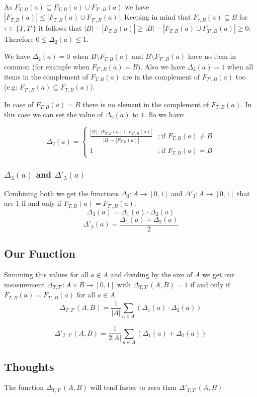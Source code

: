 As $F_{T, B}(a) \subseteq F_{T, B}(a) \cup F_{T', B}(a)$ we have $|F_{T, B}(a)| \leq |F_{T, B}(a) \cup F_{T', B}(a)|$.
Keeping in mind that $F_{\tau, B}(a) \subseteq B$ for $\tau \in \{ T, T' \}$
it follows that $|B| - |F_{T, B}(a)| \geq |B| - |F_{T, B}(a) \cup F_{T', B}(a)| \geq 0$.
Therefore $0 \leq \Delta_2(a) \leq 1$.

We have $\Delta_2(a) = 0$ when $B \setminus F_{T, B}(a)$ and $B \setminus F_{T', B}(a)$ have no item in common (for example when $F_{T', B}(a) = B$).
Also we have $\Delta_2(a) = 1$ when all items in the complement of $F_{T, B}(a)$ are in the complement of $F_{T', B}(a)$ too (e.g: $F_{T', B}(a) \subseteq F_{T, B}(a)$).

In case of $F_{T, B}(a) = B$ there is no element in the complement of $F_{T, B}(a)$.
In this case we can set the value of $\Delta_2(a)$ to $1$.
So we have:

\[
  \Delta_2(a) =
\left\{\begin{array}{ll}
    \frac{\left|B| - |F_{T, B}(a) \cup F_{T', B}(a)\right|}{|B| - |F_{T, B}(a)|}
    & ; \mbox{if } F_{T, B}(a) \neq B
    \\[1em]
    1
    & ; \mbox{if } F_{T, B}(a) = B
\end{array}\right.
\]


\subsubsection{$\Delta_3(a)$ and $\Delta'_3(a)$}
Combining both we get the functions $\Delta_3 : A \to [0,1]$ and $\Delta'_3 : A \to [0,1]$ that are $1$ if and only if $F_{T, B}(a) = F_{T', B}(a)$.
\[
  \Delta_3(a) = \Delta_1(a) \cdot \Delta_2(a)
\]
\[
  \Delta'_3(a) = \frac{\Delta_1(a) + \Delta_2(a)}{2}
\]

\subsection{Our Function}

Summing this values for all $a \in A$ and dividing by the size of $A$ we get our measurement \mbox{$\Delta_{T,T'} : A \times B \to [0,1]$}
with $\Delta_{T,T'}(A, B) = 1$ if and only if $F_{T, B}(a) = F_{T', B}(a)$ for all $a \in A$.
\begin{equation}
  \Delta_{T,T'}(A, B) = 
    \frac{1}{|A|} 
    \sum_{a \in A} (\Delta_1(a) \cdot \Delta_2(a))
\end{equation}

% 
\begin{equation}
  \Delta'_{T,T'}(A, B) = 
    \frac{1}{2 |A|} 
    \sum_{a \in A} (\Delta_1(a) + \Delta_2(a))
\end{equation}
 
 



\subsection{Thoughts}
The function $\Delta_{T,T'}(A, B)$ will tend faster to zero than $\Delta'_{T,T'}(A, B)$


